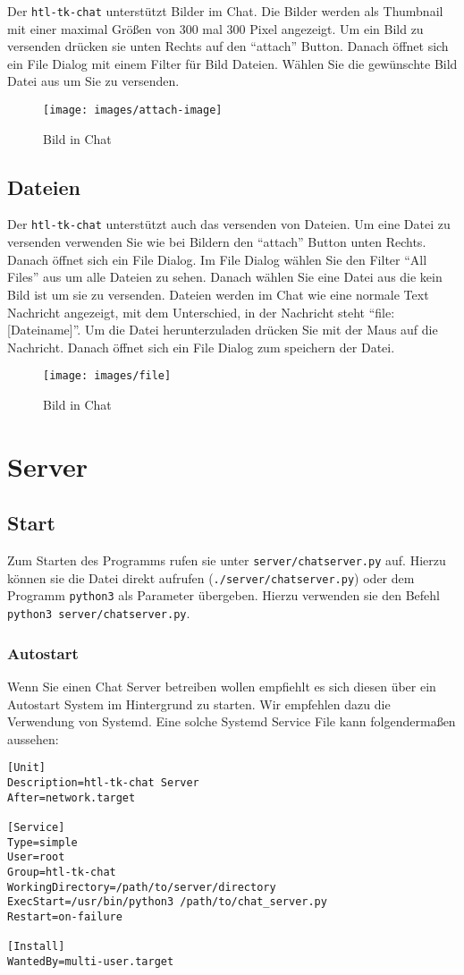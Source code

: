 \documentclass[a4paper,ngerman,headsepline, titlepage=firstiscover]{scrartcl}
\begin{document}
Der \texttt{htl-tk-chat} unterstützt Bilder im Chat. Die Bilder werden als Thumbnail mit einer maximal Größen von 300 mal 300 Pixel angezeigt. Um ein Bild zu versenden drücken sie unten Rechts auf den \enquote{attach} Button. Danach öffnet sich ein File Dialog mit einem Filter für Bild Dateien. Wählen Sie die gewünschte Bild Datei aus um Sie zu versenden.
\begin{figure}[!h]\centering
\texttt{[image: images/attach-image]}
\caption{Bild in Chat\label{fig:attach-image}}
\end{figure}
\newpage

\subsection{Dateien}

Der \texttt{htl-tk-chat} unterstützt auch das versenden von Dateien. Um eine Datei zu versenden verwenden Sie wie bei Bildern den \enquote{attach} Button unten Rechts. Danach öffnet sich ein File Dialog. Im File Dialog wählen Sie den Filter \enquote{All Files} aus um alle Dateien zu sehen. Danach wählen Sie eine Datei aus die kein Bild ist um sie zu versenden. Dateien werden im Chat wie eine normale Text Nachricht angezeigt, mit dem Unterschied, in der Nachricht steht \enquote{file: [Dateiname]}. Um die Datei herunterzuladen drücken Sie mit der Maus auf die Nachricht. Danach öffnet sich ein File Dialog zum speichern der Datei.
\begin{figure}[!h]\centering
\texttt{[image: images/file]}
\caption{Bild in Chat\label{fig:attach-file}}
\end{figure}
\newpage
\section{Server}
\subsection{Start}
Zum Starten des Programms rufen sie unter \texttt{server/chat\textunderscore server.py} auf. Hierzu können sie die Datei direkt aufrufen (\texttt{./server/chat\textunderscore server.py}) oder dem Programm \texttt{python3} als Parameter übergeben. Hierzu verwenden sie den Befehl \texttt{python3 server/chat\textunderscore server.py}.

\subsubsection{Autostart}
Wenn Sie einen Chat Server betreiben wollen empfiehlt es sich diesen über ein Autostart System im Hintergrund zu starten. Wir empfehlen dazu die Verwendung von Systemd. Eine solche Systemd Service File kann folgendermaßen aussehen:
\begin{lstlisting}[style=simple]
[Unit]
Description=htl-tk-chat Server
After=network.target

[Service]
Type=simple
User=root
Group=htl-tk-chat
WorkingDirectory=/path/to/server/directory
ExecStart=/usr/bin/python3 /path/to/chat_server.py
Restart=on-failure

[Install]
WantedBy=multi-user.target
\end{lstlisting}
\end{document}
